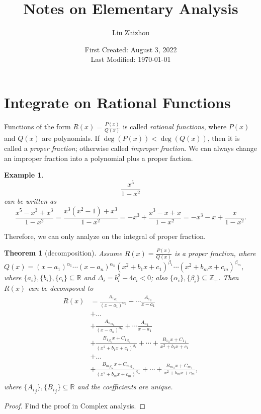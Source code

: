 \documentclass[12pt,a4paper]{article}
\title{Notes on Elementary Analysis}
\author{Liu Zhizhou}
\date{First Created: August 3, 2022\\
	Last Modified: \today}
\numberwithin{equation}{section}
\theoremstyle{mystyle}
\newtheorem{theorem}[definition]{Theorem}
\newtheorem{example}[definition]{Example}
\newcommand{\R}{\mathbb{R}}
\newcommand{\Z}{\mathbb{Z}}
\begin{document}
	{\sffamily\bfseries \maketitle}
	
	
	\tableofcontents
	
	\section{Integrate on Rational Functions}
	Functions of the form $R(x)=\frac{P(x)}{Q(x)}$ is called \emph{rational functions}, where $P(x)$ and $Q(x)$ are polynomials. If $\deg(P(x))<\deg(Q(x))$, then it is called a \emph{proper fraction}; otherwise called \emph{improper fraction}. We can always change an improper fraction into a polynomial plus a proper faction.
	\begin{example}
		$$\frac{x^5}{1-x^2}$$ can be written as $$\frac{x^5-x^3+x^3}{1-x^2}=\frac{x^3(x^2-1)+x^3}{1-x^2}=-x^3+\frac{x^3-x+x}{1-x^2}=-x^3-x+\frac{x}{1-x^2}.$$
	\end{example}
	Therefore, we can only analyze on the integral of proper fraction.
	\begin{theorem}[decomposition]
		Assume $R(x)=\frac{P(x)}{Q(x)}$ is a proper fraction, where $Q(x)=(x-a_1)^{\alpha_1}\cdots (x-a_n)^{\alpha_n}(x^2+b_1 x+c_1)^{\beta_1}\cdots (x^2+b_m x+c_m)^{\beta_m}$, where $\{a_i\},\{b_i\},\{c_i\}\subseteq \R$ and $\Delta_i = b_i^2-4c_i<0$; also $\{\alpha_i\},\{\beta_i\}\subseteq \Z_+$. Then $R(x)$ can be decomposed to
		\begin{align*}
			R(x)  &=\frac{{A_1}_{\alpha_1}}{(x-a_1)^{\alpha_1}}+\cdots \frac{{A_1}_{1}}{x-a_1}\\
			&+\dots\\
			&+\frac{{A_n}_{\alpha_n}}{(x-a_n)^{\alpha_n}}+\cdots \frac{{A_n}_{1}}{x-a_1}\\
			&+\frac{{B_1}_{\beta_1}x+{C_1}_{\beta_1}}{(x^2+b_1 x+c_1)^{\beta_1}} + \cdots + \frac{{B_1}_{1}x+{C_1}_{1}}{x^2+b_1 x+c_1}\\
			&+\dots\\
			&+\frac{{B_m}_{\beta_m}x+{C_m}_{\beta_m}}{(x^2+b_m x+c_m)^{\beta_m}}+ \cdots + \frac{{B_m}_{1}x+{C_m}_{1}}{x^2+b_m x+c_m},\\
		\end{align*}
		where $\{{A_i}_j\}, \{{B_i}_j\} \subseteq \R$ and the coefficients are unique. 
	\end{theorem}
	\begin{proof}
		Find the proof in Complex analysis.
	\end{proof}
	
\end{document}
